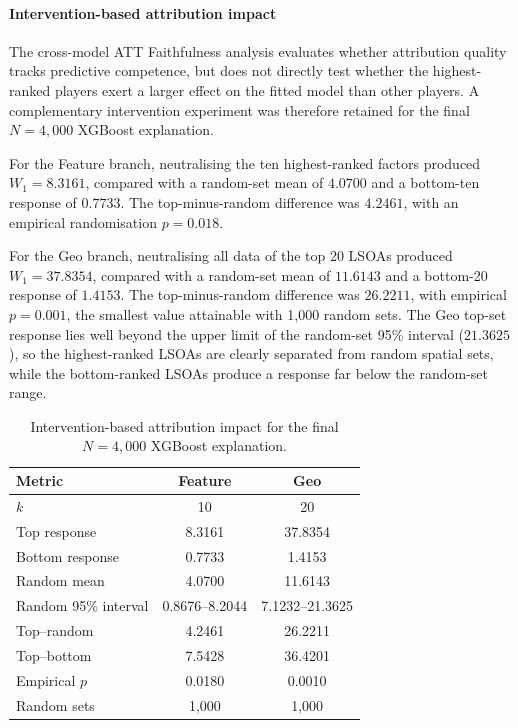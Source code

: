 \paragraph{Intervention-based attribution impact}

The cross-model ATT Faithfulness analysis evaluates whether attribution quality
tracks predictive competence, but does not directly test whether the
highest-ranked players exert a larger effect on the fitted model than other
players. A complementary intervention experiment was therefore retained for
the final $N=4{,}000$ XGBoost explanation.

For the Feature branch, neutralising the ten highest-ranked factors produced
$W_1=8.3161$, compared with a random-set mean of $4.0700$ and a bottom-ten
response of $0.7733$. The top-minus-random difference was $4.2461$, with an
empirical randomisation $p=0.018$.

For the Geo branch, neutralising all data of the top 20 LSOAs produced
$W_1=37.8354$, compared with a random-set mean of $11.6143$ and a bottom-20
response of $1.4153$. The top-minus-random difference was $26.2211$, with
empirical $p=0.001$, the smallest value attainable with 1,000 random sets. The
Geo top-set response lies well beyond the upper limit of the random-set 95\%
interval ($21.3625$), so the highest-ranked LSOAs are clearly separated from
random spatial sets, while the bottom-ranked LSOAs produce a response far
below the random-set range.

\begin{table}[H]
\centering
\caption{Intervention-based attribution impact for the final
$N=4{,}000$ XGBoost explanation.}
\label{tab:hull_intervention_impact}
\small
\begin{tabular}{lcc}
\toprule
Metric & Feature & Geo \\
\midrule
$k$                  & 10             & 20 \\
Top response         & 8.3161         & 37.8354 \\
Bottom response      & 0.7733         & 1.4153 \\
Random mean          & 4.0700         & 11.6143 \\
Random 95\% interval & 0.8676--8.2044 & 7.1232--21.3625 \\
Top--random          & 4.2461         & 26.2211 \\
Top--bottom          & 7.5428         & 36.4201 \\
Empirical $p$        & 0.0180         & 0.0010 \\
Random sets          & 1,000          & 1,000 \\
\bottomrule
\end{tabular}
\end{table}

